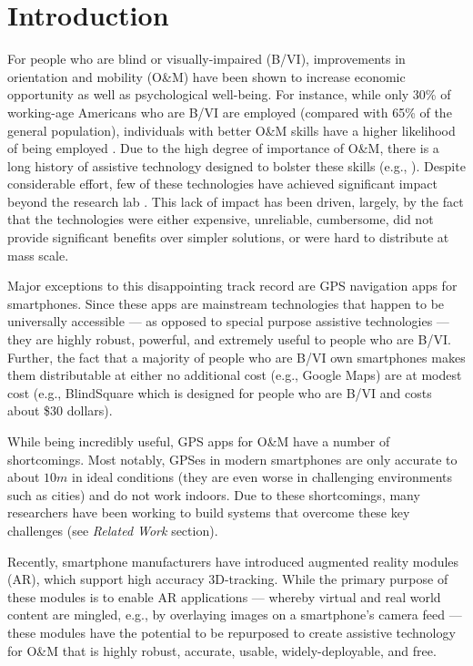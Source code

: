 \documentclass[chi_draft]{sigchi}
\newcommand{\BVI}{B/VI\xspace}
\newcommand{\OM}{O\&M\xspace}
\begin{document}
\section{Introduction}
For people who are blind or visually-impaired (\BVI), improvements in orientation and mobility (\OM) have been shown to increase economic opportunity as well as psychological well-being.  For instance, while only 30\% of working-age Americans who are \BVI are employed \cite{employmentstatistics2017, kirchner1999looking} (compared with 65\% of the general population), individuals with better \OM skills have a higher likelihood of being employed \cite{crudden1998comprehensive, crudden1999barriers, leonard1999factors, o1999employment}.  Due to the high degree of importance of \OM, there is a long history of assistive technology designed to bolster these skills (e.g., \cite{benjamin1973new, borenstein1997guidecane}).  Despite considerable effort, few of these technologies have achieved significant impact beyond the research lab \cite{wiener2010foundations}.  This lack of impact has been driven, largely, by the fact that the technologies were either expensive, unreliable, cumbersome, did not provide significant benefits over simpler solutions, or were hard to distribute at mass scale.

Major exceptions to this disappointing track record are GPS navigation apps for smartphones.  Since these apps are mainstream technologies that happen to be universally accessible --- as opposed to special purpose assistive technologies --- they are highly robust, powerful, and extremely useful to people who are \BVI.  Further, the fact that a majority of people who are \BVI own smartphones \cite{morris2014blind} makes them distributable at either no additional cost (e.g., Google Maps) are at modest cost (e.g., BlindSquare which is designed for people who are \BVI and costs about \$30 dollars).

While being incredibly useful, GPS apps for \OM have a number of shortcomings.  Most notably, GPSes in modern smartphones are only accurate to about $10m$ in ideal conditions (they are even worse in challenging environments such as cities) and do not work indoors.  Due to these shortcomings, many researchers have been working to build systems that overcome these key challenges (see \emph{Related Work} section).

Recently, smartphone manufacturers have introduced augmented reality modules (AR), which support high accuracy 3D-tracking.  While the primary purpose of these modules is to enable AR applications --- whereby virtual and real world content are mingled, e.g., by overlaying images on a smartphone's camera feed --- these modules have the potential to be repurposed to create assistive technology for \OM that is highly robust, accurate, usable, widely-deployable, and free.
\end{document}
